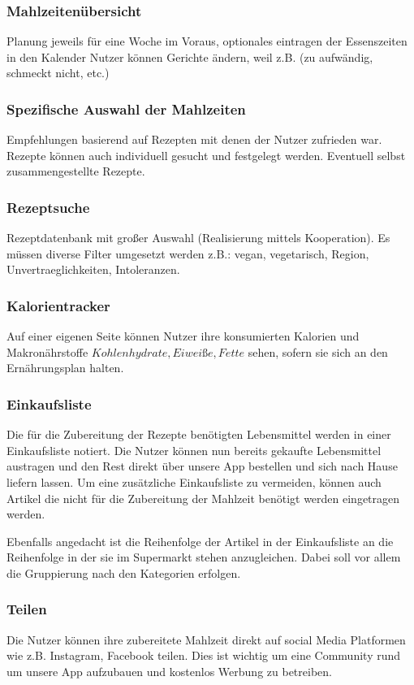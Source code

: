 \documentclass[12pt]{article}
\theoremstyle{definition}
\begin{document}
\subsubsection{Mahlzeitenübersicht}
Planung jeweils für eine Woche im Voraus, optionales eintragen der Essenszeiten in den Kalender
Nutzer können Gerichte ändern, weil z.B. (zu aufwändig, schmeckt nicht, etc.) 

\subsubsection{Spezifische Auswahl der Mahlzeiten}
Empfehlungen basierend auf Rezepten mit denen der Nutzer zufrieden war. Rezepte können auch individuell gesucht und festgelegt werden. Eventuell selbst zusammengestellte Rezepte.

\subsubsection{Rezeptsuche}
Rezeptdatenbank mit großer Auswahl (Realisierung mittels Kooperation). Es müssen diverse Filter umgesetzt werden z.B.: vegan, vegetarisch, Region, Unvertraeglichkeiten, Intoleranzen.

\subsubsection{Kalorientracker}
Auf einer eigenen Seite können Nutzer ihre konsumierten Kalorien und Makronährstoffe \(Kohlenhydrate, Eiweiße, Fette\) sehen, sofern sie sich an den Ernährungsplan halten.

\subsubsection{Einkaufsliste}
Die für die Zubereitung der Rezepte benötigten Lebensmittel werden in einer Einkaufsliste notiert. Die Nutzer können nun bereits gekaufte Lebensmittel austragen und den Rest direkt über unsere App bestellen und sich nach Hause liefern lassen. Um eine zusätzliche Einkaufsliste zu vermeiden, können auch Artikel die nicht für die Zubereitung der Mahlzeit benötigt werden eingetragen werden. 

Ebenfalls angedacht ist die Reihenfolge der Artikel in der Einkaufsliste an die Reihenfolge in der sie im Supermarkt stehen anzugleichen. Dabei soll vor allem die Gruppierung nach den Kategorien erfolgen.

\subsubsection{Teilen}
Die Nutzer können ihre zubereitete Mahlzeit direkt auf social Media Platformen wie z.B. Instagram, Facebook teilen. Dies ist wichtig um eine Community rund um unsere App aufzubauen und kostenlos Werbung zu betreiben.
\end{document}
